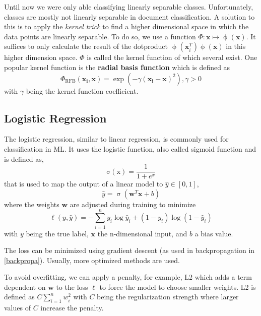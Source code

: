   Until now we were only able classifying linearly separable classes.
  Unfortunately, classes are mostly not linearly separable in document classification.
  A solution to this is to apply the \emph{kernel trick} to find a higher dimensional space in which the data points are linearly separable.
  To do so, we use a function $\Phi:\mathbf{x} \mapsto \operatorname{\phi}(\mathbf{x})$. It suffices to only calculate the result of the dotproduct $\operatorname{\phi}(\mathbf{x}^{T}_{i}) \operatorname{\phi}(\mathbf{x})$ in this higher dimension space.
  $\Phi$ is called the kernel function of which several exist.
  One popular kernel function is the \textbf{radial basis function} which is defined as \[\Phi_{\operatorname{RFB}}(\mathbf{x_i},\mathbf{x})= \operatorname{exp}(-\gamma (\mathbf{x_i} - \mathbf{x})^2), \gamma > 0 \]
  with $\gamma$ being the kernel function coefficient.

\subsection{Logistic Regression}
  The logistic regression, similar to linear regression, is commonly used for classification in ML.
  It uses the logistic function, also called sigmoid function and is defined as, \[\operatorname{\sigma(x)} = \frac{1}{1+e^x}\]
  that is used to map the output of a linear model to $\hat{y} \in [0,1]$,
  \[\hat{y} = \operatorname{\sigma}(\mathbf{w}^T\mathbf{x} +b)\]
  where the weights $\mathbf{w}$ are adjusted during training to minimize
  \[\operatorname{\ell}(y, \hat{y}) = - \sum_{i=1}^{n} y_i \log \hat{y}_i + (1-y_i) \log(1-\hat{y}_i)\]
  with $y$ being the true label, $\mathbf{x}$ the n-dimensional input, and $b$ a bias value.

  The loss can be minimized using gradient descent (as used in backpropagation in \ref{backpropa}). Usually, more optimized methods are used.

  To avoid overfitting, we can apply a penalty, for example, L2 which adds a term dependent on $\mathbf{w}$ to the loss $\ell$ to force the model to choose smaller weights.
  L2 is defined as $C \sum_{i=1}^n w_i^2$ with $C$ being the regularization strength where larger values of $C$ increase the penalty.

